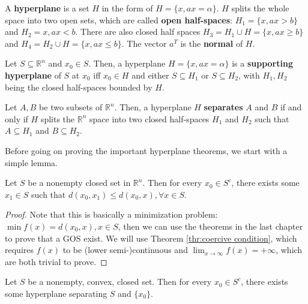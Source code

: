 \begin{definition}
  A \textbf{hyperplane} is a set \( H \) in the form of \( H = \{x, ax =
  \alpha\}   \). \( H \) splits the whole space into two open sets, which are
  called \textbf{open half-spaces}: \( H_{1} = \{x, ax > b\}   \) and \( H_{2}
  = {x, ax < b} \). There are also closed half spaces \( H_{3} = H_{1} \cup H =
  \{x, ax \ge  b\}  \) and \( H_{4} = H_{2} \cup  H = \{x, ax \le  b\}   \). The
  vector \( a^{T} \) is the \textbf{normal} of \( H \).

  Let \( S \subseteq \mathbb{R}^{n} \) and \( x_{0} \in S \). Then, a hyperplane
  \( H = \{x, ax = \alpha\}   \) is a \textbf{supporting hyperplane} of \( S \)
  at \( x_{0} \) iff \( x_{0} \in H \) and either \( S \subseteq H_{1} \) or \(
  S \subseteq H_{2}\), with \( H_{1}, H_{2} \) being the closed half-spaces
  bounded by \( H \).

  Let \( A, B \) be two subsets of \( \mathbb{R}^{n} \). Then, a hyperplane \( H
  \) \textbf{separates} \( A \) and \( B \) if and only if \( H \) splits the \(
  \mathbb{R}^{n}\) space into two closed half-spaces \( H_{1} \) and \( H_{2} \)
  such that \( A \subseteq H_{1} \) and \( B \subseteq H_{2} \).
\end{definition}

Before going on proving the important hyperplane theorems, we start with a
simple lemma.

\begin{theorem}
  Let \( S \) be a nonempty closed set in \( \mathbb{R}^{n} \). Then for every
  \( x_{0} \in S^{c} \), there exists some \( x_{1} \in S \) such that \(
  d(x_{0}, x_{1}) \le d(x_{0}, x), \forall x \in S \).
\end{theorem}

\begin{proof}
  Note that this is basically a minimization problem: \( \min f(x) = d(x_{0}, x), x \in
  S\), then we can use the theorems in the last chapter to prove that a GOS
  exist. We will use Theorem \ref{thr:coercive condition}, which requires \(
  f(x) \) to be (lower semi-)continuous and \( \lim_{x \to \infty} f(x) = +\infty \), which are both trivial to prove.
\end{proof}

\begin{theorem}
\label{thr:hst-closed-pt}
  Let \( S \) be a nonempty, convex, closed set. Then for every \( x_{0} \in S^{c}
  \), there exists some hyperplane separating \( S \) and \( \{x_{0}\}   \).
\end{theorem}

